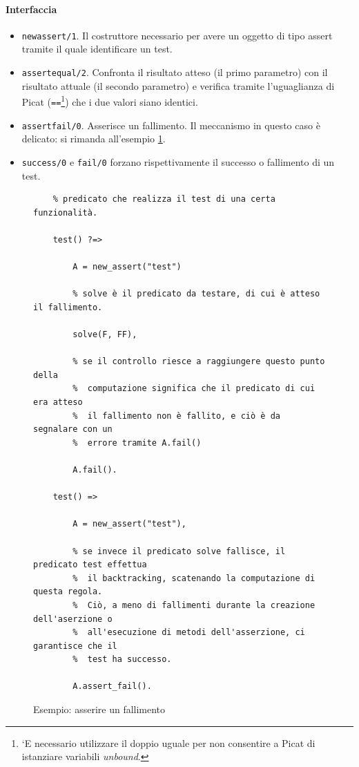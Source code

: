 \documentclass[12pt,a4paper,openright]{book} %
\begin{document}
\paragraph{Interfaccia}
\begin{itemize}
	\item \texttt{new\textunderscore assert/1}. Il costruttore necessario per avere un oggetto di tipo assert tramite il quale identificare un test.
	\item \texttt{assert\textunderscore equal/2}. Confronta il risultato atteso (il primo parametro) con il risultato attuale (il secondo parametro) e verifica tramite l'uguaglianza di Picat (\texttt{==}\footnote{`E necessario utilizzare il doppio uguale per non consentire a Picat di istanziare variabili \emph{unbound}.}) che i due valori siano identici.
	\item \texttt{assert\textunderscore fail/0}. Asserisce un fallimento. Il meccanismo in questo caso è delicato: si rimanda all'esempio \ref{fig:example_unittest_assertfail}.
	\item \texttt{success/0} e \texttt{fail/0} forzano rispettivamente il successo o fallimento di un test.
\end{itemize}

\begin{figure}
	\begin{verbatim}
	% predicato che realizza il test di una certa funzionalità.
	
	test() ?=>
	
	    A = new_assert("test")
	    
	    % solve è il predicato da testare, di cui è atteso il fallimento.
	    
	    solve(F, FF),
	    
	    % se il controllo riesce a raggiungere questo punto della 
	    %  computazione significa che il predicato di cui era atteso 
	    %  il fallimento non è fallito, e ciò è da segnalare con un 
	    %  errore tramite A.fail()
	    
	    A.fail().
	    
	test() =>
	
	    A = new_assert("test"),
	    
	    % se invece il predicato solve fallisce, il predicato test effettua
	    %  il backtracking, scatenando la computazione di questa regola.
	    %  Ciò, a meno di fallimenti durante la creazione dell'aserzione o
	    %  all'esecuzione di metodi dell'asserzione, ci garantisce che il
	    %  test ha successo.
	    
	    A.assert_fail().
	\end{verbatim}
 	\caption{Esempio: asserire un fallimento}
	\label{fig:example_unittest_assertfail}
\end{figure}
\end{document}
